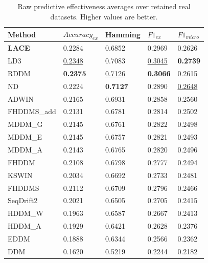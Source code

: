 \begin{table}
\caption{Raw predictive effectiveness averages over retained real datasets. Higher values are better.}
\label{tab:baseline_effectiveness_raw}
\begin{tabular}{lllll}
\toprule
Method & $Accuracy_{ex}$ & Hamming & $F1_{ex}$ & $F1_{micro}$ \\
\midrule
\textbf{LACE} & 0.2284 & 0.6852 & 0.2969 & 0.2626 \\
LD3 & \underline{0.2348} & 0.7083 & \underline{0.3045} & \textbf{0.2739} \\
RDDM & \textbf{0.2375} & \underline{0.7126} & \textbf{0.3066} & 0.2615 \\
ND & 0.2224 & \textbf{0.7127} & 0.2890 & \underline{0.2648} \\
ADWIN & 0.2165 & 0.6931 & 0.2858 & 0.2560 \\
FHDDMS\_add & 0.2131 & 0.6781 & 0.2814 & 0.2502 \\
MDDM\_G & 0.2145 & 0.6761 & 0.2822 & 0.2498 \\
MDDM\_E & 0.2145 & 0.6757 & 0.2821 & 0.2493 \\
MDDM\_A & 0.2143 & 0.6765 & 0.2820 & 0.2496 \\
FHDDM & 0.2108 & 0.6798 & 0.2777 & 0.2494 \\
KSWIN & 0.2034 & 0.6692 & 0.2733 & 0.2481 \\
FHDDMS & 0.2112 & 0.6709 & 0.2796 & 0.2466 \\
SeqDrift2 & 0.2021 & 0.6505 & 0.2705 & 0.2415 \\
HDDM\_W & 0.1963 & 0.6587 & 0.2667 & 0.2413 \\
HDDM\_A & 0.1929 & 0.6421 & 0.2628 & 0.2376 \\
EDDM & 0.1888 & 0.6344 & 0.2566 & 0.2362 \\
DDM & 0.1620 & 0.5219 & 0.2244 & 0.2182 \\
\bottomrule
\end{tabular}
\end{table}
